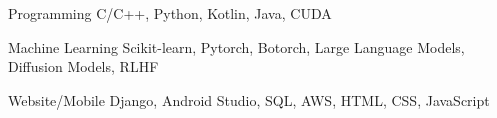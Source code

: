 

\begin{cvskills}

  \cvskill
    {Programming} %
    {C/C++, Python, Kotlin, Java, CUDA} %

  \cvskill
    {Machine Learning} %
    {Scikit-learn, Pytorch, Botorch, Large Language Models, Diffusion Models, RLHF} %

  \cvskill
    {Website/Mobile} %
    {Django, Android Studio, SQL, AWS, HTML, CSS, JavaScript} %




\end{cvskills}
